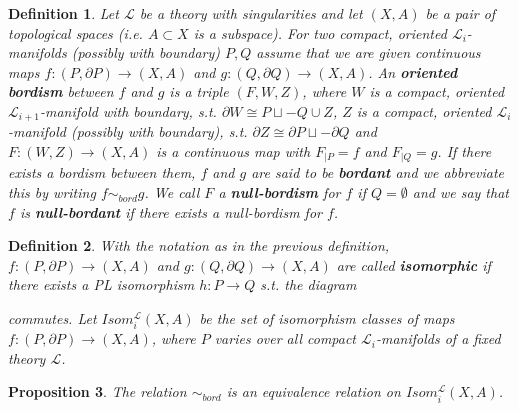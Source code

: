 \documentclass{scrreprt}
\newtheorem{prop}{Proposition}[chapter]
\newtheorem{definition}[prop]{Definition}
\begin{document}
\begin{definition}\label{bordismusdef}
Let $\mathcal{L}$ be a theory with singularities and let $(X,A)$ be a pair of topological spaces (i.e. $A \subset X$ is a subspace). For two compact, oriented $\mathcal{L}_i$-manifolds (possibly with boundary) $P,Q$  assume that we are given continuous maps $f:(P, \partial P) \to (X,A)$ and $g:(Q , \partial Q) \to (X,A)$. An \textbf{oriented bordism} between $f$ and $g$ is a triple $(F,W,Z)$, where $W$ is a compact, oriented $\mathcal{L}_{i+1}$-manifold with boundary, s.t. $\partial W \cong P \sqcup -Q \cup Z$, $Z$ is a compact, oriented $\mathcal{L}_i$-manifold (possibly with boundary), s.t. $\partial Z\cong \partial P \sqcup - \partial Q$ and $F: (W,Z) \to (X,A)$ is a continuous map with $F _{|P} = f$ and $F_{|Q}=g$. If there exists a bordism between them, $f$ and $g$ are said to be \textbf{bordant} and we abbreviate this by writing $f \sim_{bord} g$. We call $F$ a \textbf{null-bordism} for $f$ if $Q= \emptyset$ and we say that $f$ is \textbf{null-bordant} if there exists a null-bordism for $f$.
\end{definition}

\begin{definition}\label{isomorphiedef}
With the notation as in the previous definition, $f: (P, \partial P) \to (X,A)$ and $g: (Q, \partial Q) \to (X,A)$ are called \textbf{isomorphic} if there exists a PL isomorphism $h : P \to Q$ s.t. the diagram \newline
\begin{xy}
\end{xy}
\newline
commutes. Let $Isom_{i}^{\mathcal{L}}(X,A)$ be the set of isomorphism classes of maps $f: (P, \partial P) \to (X,A)$, where $P$ varies over all compact $\mathcal{L}_i$-manifolds of a fixed theory $\mathcal{L}$.
\end{definition}

\begin{prop}
The relation $\sim_{bord} $ is an equivalence relation on $Isom_{i}^{\mathcal{L}}(X,A)$.
\end{prop}
\end{document}
